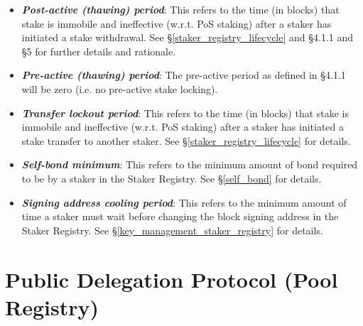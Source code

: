 \begin{itemize}
    \item \textbf{\textit{Post-active (thawing) period}}: This refers to the time (in blocks) that stake is immobile and ineffective (w.r.t. PoS staking) after a staker has initiated a stake withdrawal. See \S\ref{staker_registry_lifecycle} and \cite{WZS19} \S4.1.1 and \S5 for further details and rationale. 
    
    \item \textbf{\textit{Pre-active (thawing) period}}: The pre-active period as defined in \cite{WZS19} \S4.1.1 will be zero (i.e. no pre-active stake locking).  
    
    \item \textbf{\textit{Transfer lockout period}}: This refers to the time (in blocks) that stake is immobile and ineffective (w.r.t. PoS staking) after a staker has initiated a stake transfer to another staker. See \S\ref{staker_registry_lifecycle} for details. 
    
    \item \textbf{\textit{Self-bond minimum}}: This refers to the minimum amount of bond required to be  by a staker in the Staker Registry. See \S\ref{self_bond} for details.
    
    \item \textbf{\textit{Signing address cooling period}}: This refers to the minimum amount of time a staker must wait before changing the block signing address in the Staker Registry. See \S\ref{key_management_staker_registry} for details.
\end{itemize}









































\section{Public Delegation Protocol (Pool Registry)} \label{ads}

